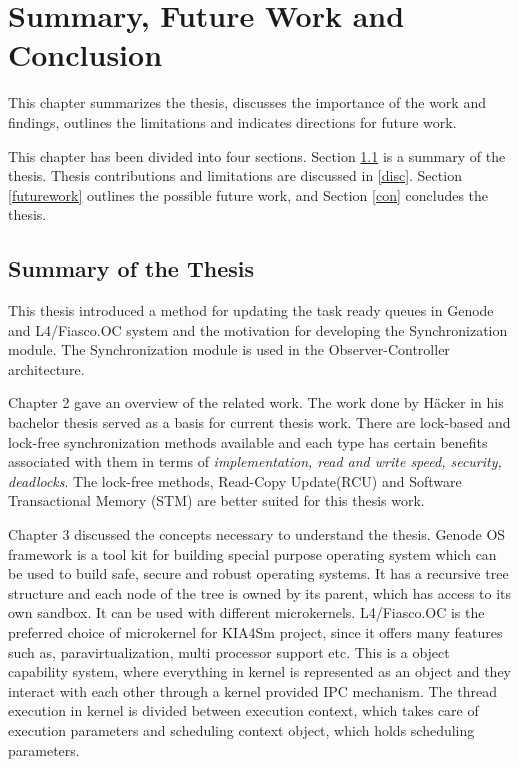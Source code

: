 \chapter{Summary, Future Work and Conclusion}
This chapter summarizes the thesis, discusses the importance of the work and findings, outlines the limitations and indicates directions for future work. 

This chapter has been divided into four sections. Section \ref{summary} is a summary of the thesis. Thesis contributions and limitations are discussed in \ref{disc}. Section \ref{futurework} outlines the possible future work, and Section \ref{con} concludes the thesis.

\section{Summary of the Thesis} \label{summary}
This thesis introduced a method for updating the task ready queues in Genode and L4/Fiasco.OC system and the motivation for developing the Synchronization module. The Synchronization module is used in the Observer-Controller architecture.

Chapter 2 gave an overview of the related work. The work done by H{\"a}cker in his bachelor thesis served as a basis for current thesis work. There are lock-based and lock-free synchronization methods available and each type has certain benefits associated with them in terms of \textit{implementation, read and write speed, security, deadlocks}. The lock-free methods, Read-Copy Update(RCU) and Software Transactional Memory (STM) are better suited for this thesis work.

Chapter 3 discussed the concepts necessary to understand the thesis. Genode OS framework is a tool kit for building special purpose operating system which can be used to build safe, secure and robust operating systems. It has a recursive tree structure and each node of the tree is owned by its parent, which has access to its own sandbox. It can be used with different microkernels. L4/Fiasco.OC is the preferred choice of microkernel for KIA4Sm project, since it offers many features such as, paravirtualization, multi processor support etc. This is a object capability system, where everything in kernel is represented as an object and they interact with each other through a kernel provided IPC mechanism. The thread execution in kernel is divided between execution context, which takes care of execution parameters and scheduling context object, which holds scheduling parameters.

